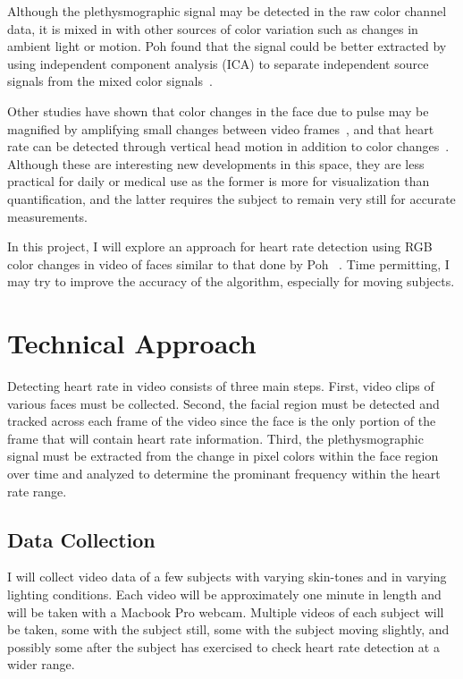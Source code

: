 \documentclass[12pt,twocolumn,letterpaper]{article}
\begin{document}
Although the plethysmographic signal may be detected in the raw color channel data, it is mixed in with other sources of color variation such as changes in ambient light or motion. Poh \etal found that the signal could be better extracted by using independent component analysis (ICA) to separate independent source signals from the mixed color signals~\cite{Poh:2010aa}.

Other studies have shown that color changes in the face due to pulse may be magnified by amplifying small changes between video frames~\cite{Wu:2012aa}, and that heart rate can be detected through vertical head motion in addition to color changes~\cite{Balakrishnan:2013aa}. Although these are interesting new developments in this space, they are less practical for daily or medical use as the former is more for visualization than quantification, and the latter requires the subject to remain very still for accurate measurements.

In this project, I will explore an approach for heart rate detection using RGB color changes in video of faces similar to that done by Poh \etal~\cite{Poh:2010aa}. Time permitting, I may try to improve the accuracy of the algorithm, especially for moving subjects.

\section*{Technical Approach}

Detecting heart rate in video consists of three main steps. First, video clips of various faces must be collected. Second, the facial region must be detected and tracked across each frame of the video since the face is the only portion of the frame that will contain heart rate information. Third, the plethysmographic signal must be extracted from the change in pixel colors within the face region over time and analyzed to determine the prominant frequency within the heart rate range.

\subsection*{Data Collection}

I will collect video data of a few subjects with varying skin-tones and in varying lighting conditions. Each video will be approximately one minute in length and will be taken with a Macbook Pro webcam. Multiple videos of each subject will be taken, some with the subject still, some with the subject moving slightly, and possibly some after the subject has exercised to check heart rate detection at a wider range.
\end{document}
